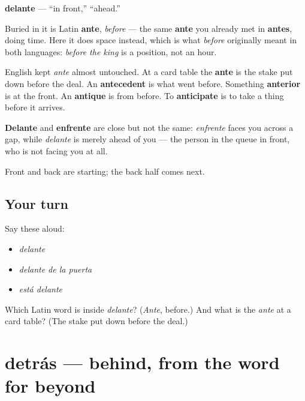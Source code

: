 \begin{cousinweb}
\textbf{delante} — \textquotedblleft{}in front,\textquotedblright{} \textquotedblleft{}ahead.\textquotedblright{}

Buried in it is Latin \textbf{ante}, \emph{before} — the same \textbf{ante} you already met in \textbf{antes}, doing time. Here it does space instead, which is what \emph{before} originally meant in both languages: \emph{before the king} is a position, not an hour.

English kept \emph{ante} almost untouched. At a card table the \textbf{ante} is the stake put down before the deal. An \textbf{antecedent} is what went before. Something \textbf{anterior} is at the front. An \textbf{antique} is from before. To \textbf{anticipate} is to take a thing before it arrives.

\textbf{Delante} and \textbf{enfrente} are close but not the same: \emph{enfrente} faces you across a gap, while \emph{delante} is merely ahead of you — the person in the queue in front, who is not facing you at all.
\end{cousinweb}

\begin{grammarlens}[title={What you've built}]
Front and back are starting; the back half comes next.
\end{grammarlens}

\subsection*{Your turn}
Say these aloud:

\begin{itemize}
\raggedright
  \item \emph{delante}
  \item \emph{delante de la puerta}
  \item \emph{está delante}
\end{itemize}

\begin{tcolorbox}[breakable,colback=teal!4,colframe=teal!35!black,title={Before you move on}]
Which Latin word is inside \emph{delante}? (\emph{Ante}, before.) And what is the \emph{ante} at a card table? (The stake put down before the deal.)
\end{tcolorbox}
\section[detrás]{detrás — behind, from the word for beyond}

